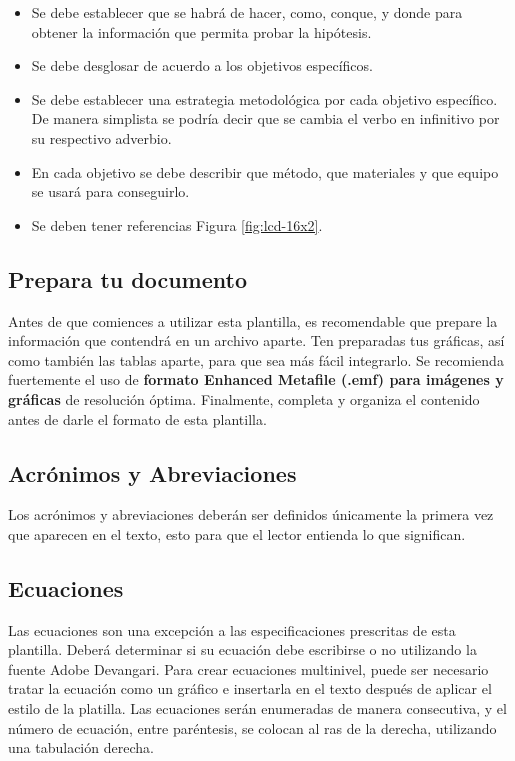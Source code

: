     \begin{itemize}
        \item Se debe establecer que se habrá de hacer, como, conque, y donde para obtener la información que permita probar la hipótesis.  
        \item Se debe desglosar de acuerdo a los objetivos específicos. 
        \item Se debe establecer una estrategia metodológica por cada objetivo específico. De manera simplista se podría decir que se cambia el verbo en infinitivo por su respectivo adverbio.
        \item En cada objetivo se debe describir que método, que materiales y que equipo se usará para conseguirlo.
        \item Se deben tener referencias Figura \ref{fig:lcd-16x2}.
    \end{itemize}
    \begin{figure}[H]
    
    \end{figure}
    
    \subsection{Prepara tu documento}
    
    Antes de que comiences a utilizar esta plantilla, es recomendable que prepare la información que contendrá en un archivo aparte. 
    Ten preparadas tus gráficas, así como también las tablas aparte, para que sea más fácil integrarlo. 
    Se recomienda fuertemente el uso de \textbf{formato Enhanced Metafile (.emf) para imágenes y gráficas} de resolución óptima. 
    Finalmente, completa y organiza el contenido antes de darle el formato de esta plantilla. 
    
    \subsection{Acrónimos y Abreviaciones}
    
    Los acrónimos y abreviaciones deberán ser definidos únicamente la primera vez que aparecen en el texto, esto para que el lector entienda lo que significan.
    
    \subsection{Ecuaciones}
    
    Las ecuaciones son una excepción a las especificaciones prescritas de esta plantilla. 
    Deberá determinar si su ecuación debe escribirse o no utilizando la fuente Adobe Devangari. 
    Para crear ecuaciones multinivel, puede ser necesario tratar la ecuación como un gráfico e insertarla en el texto después de aplicar el estilo de la platilla.
    Las ecuaciones serán enumeradas de manera consecutiva, y el número de ecuación, entre paréntesis, se colocan al ras de la derecha, utilizando una tabulación derecha. 
    

